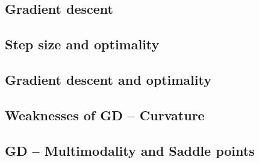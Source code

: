 \subsection{Gradient descent}


\subsection{Step size and optimality}


\subsection{Gradient descent and optimality}


\subsection{Weaknesses of GD -- Curvature}


\subsection{GD -- Multimodality and Saddle points}

